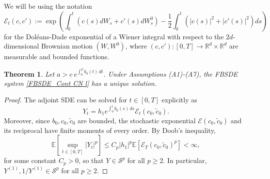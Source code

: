 \documentclass[11pt,a4paper]{article}
\newtheorem{theo}{Theorem}[section]
\begin{document}
We will be using the notation
\[\mathcal{E}_t(c,c') := \exp\left( \int_0 ^t (c(s)dW_s + c'(s)dW^0 _s)  - \frac{1}{2}\int_0 ^t (|c(s)|^2 + |c'(s)|^2)ds \right)\] for the Dol\'eans-Dade exponential of a Wiener integral with respect to the $2d$-dimensional Brownian motion $(W,W^0)$, where $(c,c'):[0,T] \to \mathbb R^d \times \mathbb R^d$ are measurable and bounded functions.
\begin{theo}
\label{EXUN} 
Let $a > c \ e^{\int_0^T b_0(t)\, dt}$.    Under Assumptions  (A1)-(A7), the FBSDE system \eqref{FBSDE_Cont CN l} has a unique  solution.
\end{theo}
\begin{proof}
  The adjoint SDE can be solved for $t \in [0,T]$ explicitly as
\begin{equation}
\label{solution of forward CN l}
Y_t= h_1 e^{\int_0^t b_0(s)\, ds} \mathcal{E}_t\left(c_0 ,\tilde{c}_0 \right).
\end{equation} 
Moreover, since $b_0, c_0, \tilde{c}_0$ are bounded, the stochastic exponential $\mathcal E(c_0,\tilde c_0)$ and its reciprocal have finite moments of every order. By Doob's inequality,
\[ \mathbb E\left[\sup_{t\in [0,T]} |Y_t|^p\right] \leq C_p |h_1|^p \mathbb E\left[ \mathcal E_T (c_0,\tilde c_0)^p\right] < \infty,\]
for some constant $C_p >0$, so that $Y \in \mathcal S^p$ for all $p \geq  2$. In particular, $Y^{(1)}, 1/Y^{(1)}\in \mathcal S^p $ for all $p \geq  2$.


\end{proof}
\end{document}
